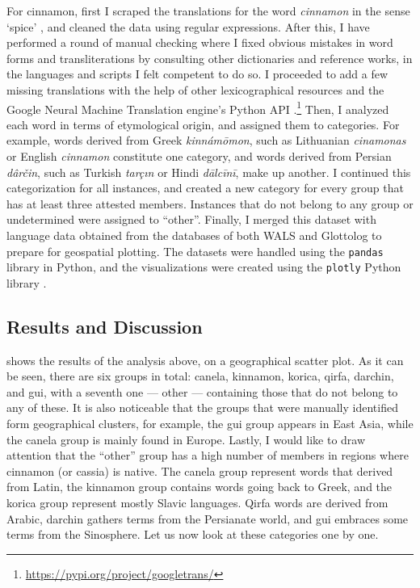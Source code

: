 For cinnamon, first I scraped the translations for the word \textit{cinnamon} in the sense `spice' \autocite{wiktionary_cinnamon_nodate}, and cleaned the data using regular expressions. After this, I have performed a round of manual checking where I fixed obvious mistakes in word forms and transliterations by consulting other dictionaries and reference works, in the languages and scripts I felt competent to do so. I proceeded to add a few missing translations with the help of other lexicographical resources and the Google Neural Machine Translation engine's Python API \autocite{wu_googles_2016}.\footnote{\url{https://pypi.org/project/googletrans/}} Then, I analyzed each word in terms of etymological origin, and assigned them to categories. For example, words derived from Greek \textit{kinnámōmon}, such as Lithuanian \textit{cinamonas} or English \textit{cinnamon} constitute one category, and words derived from Persian \textit{dârčin}, such as Turkish \textit{tarçın} or Hindi \textit{dālcīnī}, make up another. I continued this categorization for all instances, and created a new category for every group that has at least three attested members. Instances that do not belong to any group or undetermined were assigned to ``other''. Finally, I merged this dataset with language data obtained from the databases of both \gls{WALS} \autocite{dryer_wals_2013} and Glottolog \autocite{hammarstrom_glottolog_2022} to prepare for geospatial plotting. The datasets were handled using the \texttt{pandas} library in Python, and the visualizations were created using the \texttt{plotly} Python library \autocites{pandas, plotly}.

\subsection{Results and Discussion}

 shows the results of the analysis above, on a geographical scatter plot. As it can be seen, there are six groups in total: canela, kinnamon, korica, qirfa, darchin, and gui, with a seventh one --- other --- containing those that do not belong to any of these. It is also noticeable that the groups that were manually identified form geographical clusters, for example, the gui group appears in East Asia, while the canela group is mainly found in Europe. Lastly, I would like to draw attention that the ``other'' group has a high number of members in regions where cinnamon (or cassia) is native. The canela group represent words that derived from Latin, the kinnamon group contains words going back to Greek, and the korica group represent mostly Slavic languages. Qirfa words are derived from Arabic, darchin gathers terms from the Persianate world, and gui embraces some terms from the Sinosphere. Let us now look at these categories one by one.


